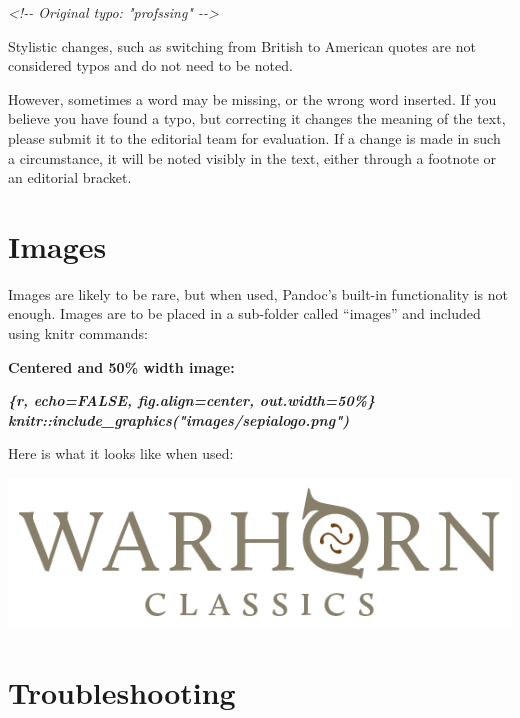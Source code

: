 \documentclass[
]{book}
\newenvironment{Shaded}{\begin{snugshade}}{\end{snugshade}}
\newcommand{\CommentTok}[1]{\textcolor[rgb]{0.56,0.35,0.01}{\textit{#1}}}
\newcommand{\InformationTok}[1]{\textcolor[rgb]{0.56,0.35,0.01}{\textbf{\textit{#1}}}}
\begin{document}
\begin{Shaded}
\begin{Highlighting}[]
\CommentTok{\textless{}!{-}{-} Original typo: "profssing" {-}{-}\textgreater{}}
\end{Highlighting}
\end{Shaded}

Stylistic changes, such as switching from British to American quotes are not considered typos and do not need to be noted.

However, sometimes a word may be missing, or the wrong word inserted. If you believe you have found a typo, but correcting it changes the meaning of the text, please submit it to the editorial team for evaluation. If a change is made in such a circumstance, it will be noted visibly in the text, either through a footnote or an editorial bracket.

\hypertarget{images}{%
\chapter{Images}\label{images}}

Images are likely to be rare, but when used, Pandoc's built-in functionality is not enough. Images are to be placed in a sub-folder called ``images'' and included using knitr commands:

\textbf{Centered and 50\% width image:}

\begin{Shaded}
\begin{Highlighting}[]
\InformationTok{\textasciigrave{}\textasciigrave{}\textasciigrave{}\{r, echo=FALSE, fig.align=\textquotesingle{}center\textquotesingle{}, out.width=\textquotesingle{}50\%\textquotesingle{}\}}
\InformationTok{knitr::include\_graphics("images/sepialogo.png")}
\InformationTok{\textasciigrave{}\textasciigrave{}\textasciigrave{}}
\end{Highlighting}
\end{Shaded}

Here is what it looks like when used:

\begin{center}\includegraphics[width=0.5\linewidth]{images/sepialogo} \end{center}

\hypertarget{troubleshooting}{%
\chapter{Troubleshooting}\label{troubleshooting}}
\end{document}
